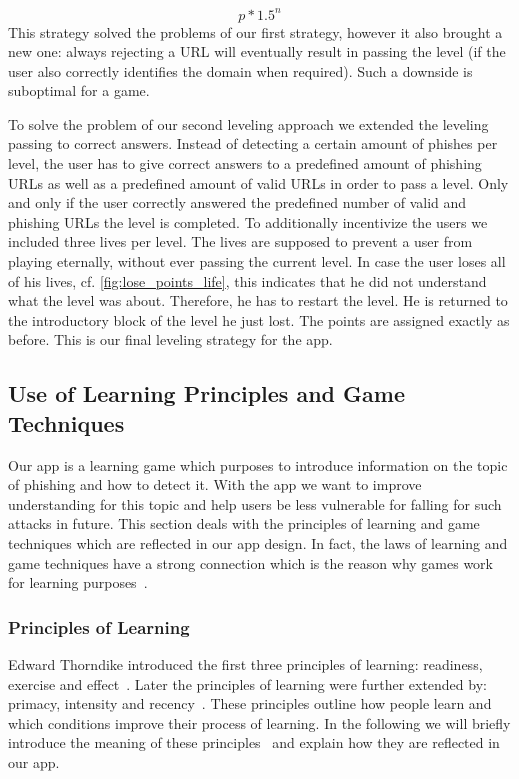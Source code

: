 \begin{description}[leftmargin=0cm]
 $$p*1.5^n$$
 This strategy solved the problems of our first strategy, however it also brought a new one: always rejecting a URL will eventually result in passing the level (if the user also correctly identifies the domain when required). Such a downside is suboptimal for a game.
	\item[Leveling Based on Correct Answers:] To solve the problem of our second leveling approach we extended the leveling passing to correct answers.
 Instead of detecting a certain amount of phishes per level, the user has to give correct answers to a predefined amount of phishing URLs as well as a predefined amount of valid URLs in order to pass a level.
 Only and only if the user correctly answered the predefined number of valid and phishing URLs the level is completed.
 To additionally incentivize the users we included three lives per level.
 The lives are supposed to prevent a user from playing eternally, without ever passing the current level.
 In case the user loses all of his lives, cf. \autoref{fig:lose_points_life}, this indicates that he did not understand what the level was about.
 Therefore, he has to restart the level. He is returned to the introductory block of the level he just lost.
 The points are assigned exactly as before.
 This is our final leveling strategy for the app.
\end{description}

\subsection{Use of Learning Principles and Game Techniques}
\label{s:learning_principles_and_game_techniques}
Our app is a learning game which purposes to introduce information on the topic of phishing and how to detect it.
With the app we want to improve understanding for this topic and help users be less vulnerable for falling for such attacks in future.
This section deals with the principles of learning and game techniques which are reflected in our app design.
In fact, the laws of learning and game techniques have a strong connection which is the reason why games work for learning purposes~\cite{murphy2011games}.
\subsubsection{Principles of Learning}
\label{s:learning_principles}
Edward Thorndike introduced the first three principles of learning: readiness, exercise and effect~\cite{thorndike1932fundamentals, murphy2011games, handbook2008us}. 
Later the principles of learning were further extended by: primacy, intensity and recency~\cite{murphy2011games, handbook2008us}.
These principles outline how people learn and which conditions improve their process of learning.
In the following we will briefly introduce the meaning of these principles~\cite{murphy2011games} and explain how they are reflected in our app.

